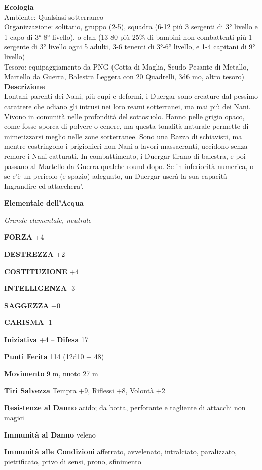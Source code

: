 \begin{multicols}{2}
\textbf{Ecologia}\\
Ambiente: Qualsiasi sotterraneo\\
Organizzazione: solitario, gruppo (2-5), squadra (6-12 più 3 sergenti di 3° livello e 1 capo di 3°-8° livello), o clan (13-80 più 25\% di bambini non combattenti più 1 sergente di 3° livello ogni 5 adulti, 3-6 tenenti di 3°-6° livello, e 1-4 capitani di 9° livello)\\
Tesoro: equipaggiamento da PNG (Cotta di Maglia, Scudo Pesante di Metallo, Martello da Guerra, Balestra Leggera con 20 Quadrelli, 3d6 mo, altro tesoro)\\
\textbf{Descrizione}\\
Lontani parenti dei Nani, più cupi e deformi, i Duergar sono creature dal pessimo carattere che odiano gli intrusi nei loro reami sotterranei, ma mai più dei Nani. Vivono in comunità nelle profondità del sottosuolo. Hanno pelle grigio opaco, come fosse sporca di polvere o cenere, ma questa tonalità naturale permette di mimetizzarsi meglio nelle zone sotterranee. Sono una Razza di schiavisti, ma mentre costringono i prigionieri non Nani a lavori massacranti, uccidono senza remore i Nani catturati. In combattimento, i Duergar tirano di balestra, e poi passano al Martello da Guerra qualche round dopo. Se in inferiorità numerica, o se c'è un pericolo (e spazio) adeguato, un Duergar userà la sua capacità Ingrandire ed attacchera'.

\medskip{}\textbf{Elementale dell'Acqua}

\emph{Grande elementale, neutrale}

\textbf{FORZA} +4

\textbf{DESTREZZA} +2

\textbf{COSTITUZIONE} +4

\textbf{INTELLIGENZA} -3

\textbf{SAGGEZZA} +0

\textbf{CARISMA} -1

\textbf{Iniziativa} +4 -- \textbf{Difesa} 17

\textbf{Punti Ferita} 114 (12d10 + 48)

\textbf{Movimento} 9 m, nuoto 27 m

\textbf{Tiri Salvezza} Tempra +9, Riflessi +8, Volontà +2

\textbf{Resistenze al Danno} acido; da botta, perforante e tagliente di attacchi non magici

\textbf{Immunità al Danno} veleno

\textbf{Immunità alle Condizioni} afferrato, avvelenato, intralciato, paralizzato, pietrificato, privo di sensi, prono, sfinimento


\end{multicols}
